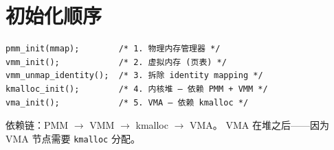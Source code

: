 \section{初始化顺序}

\begin{lstlisting}[style=cstyle]
pmm_init(mmap);        /* 1. 物理内存管理器 */
vmm_init();            /* 2. 虚拟内存 (页表) */
vmm_unmap_identity();  /* 3. 拆除 identity mapping */
kmalloc_init();        /* 4. 内核堆 — 依赖 PMM + VMM */
vma_init();            /* 5. VMA — 依赖 kmalloc */
\end{lstlisting}

依赖链：PMM $\to$ VMM $\to$ kmalloc $\to$ VMA。
VMA 在堆之后——因为 VMA 节点需要 \texttt{kmalloc} 分配。


